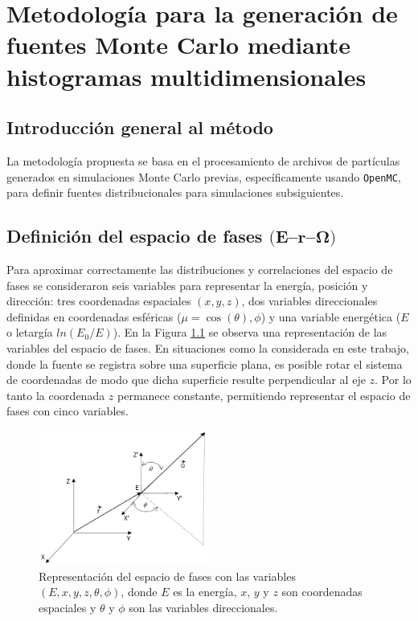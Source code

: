 \chapter{Metodología para la generación de fuentes Monte Carlo mediante histogramas multidimensionales}
\label{cap:metodo_histogramas}
\section{Introducción general al método}
La metodología propuesta se basa en el procesamiento de archivos de partículas generados en simulaciones Monte Carlo previas, específicamente usando \texttt{OpenMC}, para definir fuentes distribucionales para simulaciones subsiguientes.

\section{Definición del espacio de fases \texorpdfstring{$(\mathbf{E}$--$\mathbf{r}$--$\boldsymbol{\Omega})$}{(E--r--Omega)}}
Para aproximar correctamente las distribuciones y correlaciones del espacio de fases se consideraron seis variables para representar la energía, posición y dirección: tres coordenadas espaciales $(x, y, z)$, dos variables direccionales definidas en coordenadas esféricas ($\mu = \cos(\theta), \phi$) y una variable energética ($E$ o letargía $ln(E_0/E)$). En la Figura \ref{fig:terna} se observa una representación de las variables del espacio de fases. En situaciones como la considerada en este trabajo, donde la fuente se registra sobre una superficie plana, es posible rotar el sistema de coordenadas de modo que dicha superficie resulte perpendicular al eje $z$. Por lo tanto la coordenada $z$ permanece constante, permitiendo representar el espacio de fases con cinco variables.

\begin{figure}[h]
    \centering
    \includegraphics[width=0.5\textwidth]{figs/terna.png}
    \caption{Representación del espacio de fases con las variables $(E, x, y, z, \theta, \phi)$, donde $E$ es la energía, $x$, $y$ y $z$ son coordenadas espaciales y $\theta$ y $\phi$ son las variables direccionales.}
    \label{fig:terna}
\end{figure}

